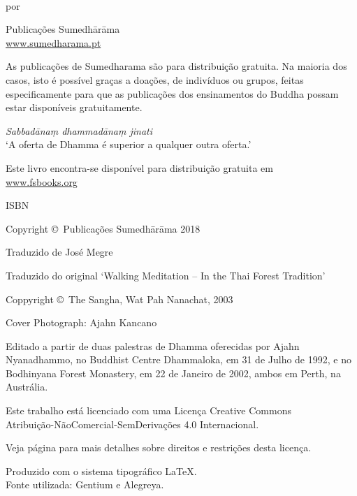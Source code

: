 \cleartoverso
\thispagestyle{empty}

{\copyrightsize
\centering
\setlength{\parindent}{0pt}%
\setlength{\parskip}{0.8\baselineskip}%

\thetitle\\
por \theauthor

Publicações Sumedhārāma\\
\href{http://sumedharama.pt}{www.sumedharama.pt}

As publicações de Sumedharama são para distribuição gratuita. Na maioria
dos casos, isto é possível graças a doações, de indivíduos ou grupos,
feitas especificamente para que as publicações dos ensinamentos do
Buddha possam estar disponíveis gratuitamente.

\textit{Sabbadānaṃ dhammadānaṃ jinati}\\
`A oferta de Dhamma é superior a qualquer outra oferta.'

Este livro encontra-se disponível para distribuição gratuita em\\
\href{http://fsbooks.org/}{www.fsbooks.org}

ISBN \theISBN

Copyright \copyright\ Publicações Sumedhārāma 2018

Traduzido de José Megre

Traduzido do original `Walking Meditation -- In the Thai Forest Tradition'

Coppyright \copyright\ The Sangha, Wat Pah Nanachat, 2003

Cover Photograph: Ajahn Kancano

Editado a partir de duas palestras de Dhamma oferecidas por
Ajahn Nyanadhammo, no Buddhist Centre Dhammaloka, em 31 de Julho de
1992, e no Bodhinyana Forest Monastery, em 22 de Janeiro de 2002, ambos
em Perth, na Austrália.

\vfill

{\footnotesize

Este trabalho está licenciado com uma Licença Creative Commons\\
Atribuição-NãoComercial-SemDerivações 4.0 Internacional.

Veja página \pageref{copyright-details} para mais detalhes sobre direitos e restrições desta licença.

Produzido com o sistema tipográfico \LaTeX.\\
Fonte utilizada: Gentium e Alegreya.

\theEditionInfo

}}
